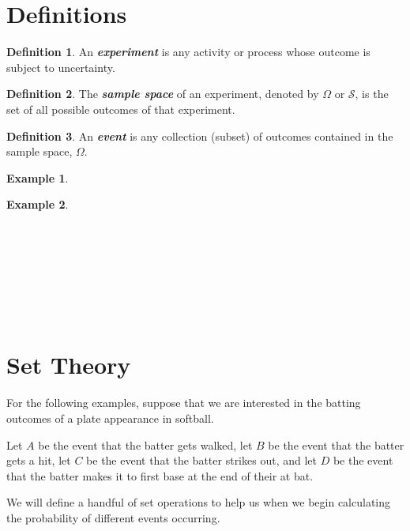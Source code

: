 \documentclass[
  11pt,
]{book}
\theoremstyle{definition}
\newtheorem{definition}{Definition}[chapter]
\theoremstyle{definition}
\newtheorem{example}{Example}[chapter]
\theoremstyle{definition}
\theoremstyle{definition}
\theoremstyle{remark}
\begin{document}
\hypertarget{definitions-1}{%
\section{Definitions}\label{definitions-1}}

\begin{definition}
An \textbf{\emph{experiment}} is any activity or process whose outcome is subject to uncertainty.
\end{definition}

\begin{definition}
The \textbf{\emph{sample space}} of an experiment, denoted by \(\Omega\) or \(\mathcal{S}\), is the set of all possible outcomes of that experiment.
\end{definition}

\begin{definition}
An \textbf{\emph{event}} is any collection (subset) of outcomes contained in the sample space, \(\Omega\).
\end{definition}

\begin{example}
\[ \]
\end{example}

\hfill\break
\hfill\break
\hfill\break
\hfill\break
\hfill\break

\begin{example}
\[ \]
\end{example}

~\\
\strut \\
\strut \\
\strut \\

\hypertarget{set-theory}{%
\section{Set Theory}\label{set-theory}}

For the following examples, suppose that we are interested in the batting outcomes of a plate appearance in softball.

Let \(A\) be the event that the batter gets walked, let \(B\) be the event that the batter gets a hit, let \(C\) be the event that the batter strikes out, and let \(D\) be the event that the batter makes it to first base at the end of their at bat.

We will define a handful of set operations to help us when we begin calculating the probability of different events occurring.
\end{document}

